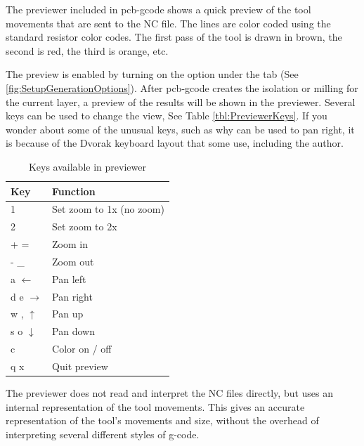 \documentclass[11pt]{book}
\begin{document}
The previewer included in pcb-gcode shows a quick preview of the tool movements that are sent to the NC file. The lines are color coded using the standard resistor color codes. The first pass of the tool is drawn in brown, the second is red, the third is orange, etc.

The preview is enabled by turning on the  option under the  tab (See \figurename \vref{fig:SetupGenerationOptions}). After pcb-gcode creates the isolation or milling for the current layer, a preview of the results will be shown in the previewer. Several keys can be used to change the view, See Table \vref{tbl:PreviewerKeys}. If you wonder about some of the unusual keys, such as why  can be used to pan right, it is because of the Dvorak keyboard layout that some use, including the author.

\begin{table}[h]\caption{Keys available in previewer}\label{tbl:PreviewerKeys}
\centering
\begin{tabular}{ll}
	\toprule
	Key 		& Function\\ 
	\midrule
	1		& Set zoom to 1x (no zoom)\\
	2		& Set zoom to 2x\\
	+ =		& Zoom in\\
	- \_{}		& Zoom out\\
	a $\leftarrow$ & Pan left\\
	d e $\rightarrow$ & Pan right\\
	w , $\uparrow$ & Pan up\\
	s o $\downarrow$ & Pan down\\
	c		& Color on / off\\
	q x		& Quit preview \\ \bottomrule
\end{tabular}
\end{table}

The previewer does not read and interpret the NC files directly, but uses an internal representation of the tool movements. This gives an accurate representation of the tool's movements and size, without the overhead of interpreting several different styles of g-code.
\end{document}
